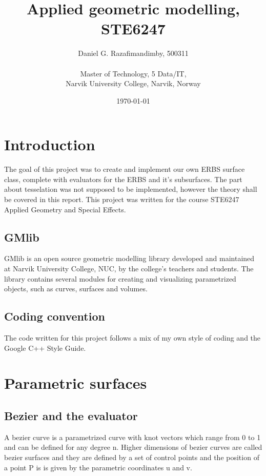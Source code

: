 \documentclass[a4paper,11pt]{article}
\title{Applied geometric modelling, STE6247}
\author{
Daniel G. Razafimandimby, 500311 \\ \\
Master of Technology, 5 Data/IT, \\
Narvik University College, Narvik, Norway
}
\date{\today}
\begin{document}
\maketitle
\begin{abstract}
\end{abstract}
\section{Introduction}
The goal of this project was to create and implement our own ERBS surface class, complete with evaluators for the ERBS and it's subsurfaces. The part about tesselation was not supposed to be implemented, however the theory shall be covered
in this report. This project was written for the course STE6247 Applied Geometry and Special Effects. 
\subsection{GMlib}
GMlib is an open source geometric modelling library developed and maintained at Narvik University College, NUC, by the college's teachers and students. The library contains several modules for creating and visualizing parametrized objects, such as curves, surfaces and volumes.
\subsection{Coding convention}
The code written for this project follows a mix of my own style of coding and the Google C++ Style Guide. 

\section{Parametric surfaces}
\subsection{Bezier and the evaluator}
A bezier curve is a parametrized curve with knot vectors which range from 0 to 1 and can be defined for any degree n. Higher dimensions of bezier curves are called bezier surfaces and they are defined by a set of control points and the position of a point P is is given by the parametric coordinates u and v.
\end{document}
